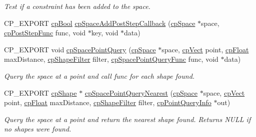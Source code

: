 \begin{DoxyCompactItemize}
\begin{DoxyCompactList}\small\item\em Test if a constraint has been added to the space. \end{DoxyCompactList}\item 
C\+P\+\_\+\+E\+X\+P\+O\+RT \mbox{\hyperlink{group__basic_types_gabc5e752c48f3449ca26ef413ecbd647e}{cp\+Bool}} \mbox{\hyperlink{group__cp_space_ga6fbf3c0722a5618ded1ed7371cbebcb3}{cp\+Space\+Add\+Post\+Step\+Callback}} (\mbox{\hyperlink{structcp_space}{cp\+Space}} $\ast$space, \mbox{\hyperlink{group__cp_space_ga93e9005e387fec86eeb4a225ac295a23}{cp\+Post\+Step\+Func}} func, void $\ast$key, void $\ast$data)
\item 
\mbox{\label{group__cp_space_ga62eea2b00f5503976ef250a33d4c474a}} 
C\+P\+\_\+\+E\+X\+P\+O\+RT void \mbox{\hyperlink{group__cp_space_ga62eea2b00f5503976ef250a33d4c474a}{cp\+Space\+Point\+Query}} (\mbox{\hyperlink{structcp_space}{cp\+Space}} $\ast$space, \mbox{\hyperlink{structcp_vect}{cp\+Vect}} point, \mbox{\hyperlink{group__basic_types_gac1ed65573e035bf892505768c852d8d3}{cp\+Float}} max\+Distance, \mbox{\hyperlink{structcp_shape_filter}{cp\+Shape\+Filter}} filter, \mbox{\hyperlink{group__cp_space_ga646a55f0937f07c19b24561ed5341221}{cp\+Space\+Point\+Query\+Func}} func, void $\ast$data)
\begin{DoxyCompactList}\small\item\em Query the space at a point and call {\ttfamily func} for each shape found. \end{DoxyCompactList}\item 
\mbox{\label{group__cp_space_ga188b8fbff10d2a236644fc9fa85cb31a}} 
C\+P\+\_\+\+E\+X\+P\+O\+RT \mbox{\hyperlink{structcp_shape}{cp\+Shape}} $\ast$ \mbox{\hyperlink{group__cp_space_ga188b8fbff10d2a236644fc9fa85cb31a}{cp\+Space\+Point\+Query\+Nearest}} (\mbox{\hyperlink{structcp_space}{cp\+Space}} $\ast$space, \mbox{\hyperlink{structcp_vect}{cp\+Vect}} point, \mbox{\hyperlink{group__basic_types_gac1ed65573e035bf892505768c852d8d3}{cp\+Float}} max\+Distance, \mbox{\hyperlink{structcp_shape_filter}{cp\+Shape\+Filter}} filter, \mbox{\hyperlink{structcp_point_query_info}{cp\+Point\+Query\+Info}} $\ast$out)
\begin{DoxyCompactList}\small\item\em Query the space at a point and return the nearest shape found. Returns N\+U\+LL if no shapes were found. \end{DoxyCompactList}\item 

\end{DoxyCompactItemize}
